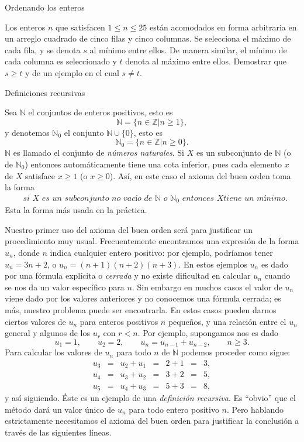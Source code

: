 \begin{section}{Ordenando los enteros}
\begin{enumex}
    \item Los enteros $n$ que satisfacen $1 \le n \le 25$ están acomodados en forma arbitraria en un arreglo cuadrado de cinco filas y cinco columnas. Se selecciona el máximo  de cada fila, y se denota $s$ al mínimo entre ellos. De manera similar, el mínimo de cada columna es seleccionado y $t$ denota al máximo entre ellos. Demostrar que $s\ge t$ y de un ejemplo en el cual $s\not=t$.
\end{enumex}

\end{section}

\begin{section}{Definiciones recursivas}\label{seccion-definiciones-recursivas}

Sea $\mathbb N$ el conjuntos de enteros positivos, esto es
$$
\mathbb N = \{ n \in \mathbb Z | n\ge 1\},
$$
y denotemos $\mathbb N_0$ el conjunto $\mathbb N \cup \{0\}$, esto
es
$$
\mathbb N_0 = \{ n \in \mathbb Z | n\ge 0\}.
$$
$\mathbb{N}$  es llamado el conjunto de  \textit{números naturales}. Si $X$ es un subconjunto de $\mathbb N$ (o de $\mathbb N_0$)  entonces automáticamente tiene una cota inferior, pues cada elemento $x$ de $X$ satisface $x\ge 1$ (o $x\ge 0$). As{í}, en este caso el axioma del buen orden toma la forma
$$
\begin{aligned}
&\textit{si $X$ es un subconjunto no vacío de $\mathbb N$ o $\mathbb N_0$ entonces $X$
 tiene un mínimo.}
\end{aligned}
$$
Esta la forma más usada en la práctica.

Nuestro primer uso del axioma del buen orden será para justificar un procedimiento muy usual. Frecuentemente encontramos una expresión de la forma $u_n$, donde $n$ indica cualquier entero positivo: por ejemplo, podríamos tener $u_n=3n+2$, o $u_n = (n+1)(n+2)(n+3)$. En estos ejemplos $u_n$ es dado por una fórmula explícita o \textit{cerrada} y no existe dificultad en calcular $u_n$ cuando se nos da un valor específico para $n$. Sin embargo en muchos casos el valor de $u_n$ viene dado por los valores anteriores y no conocemos una fórmula cerrada; es más, nuestro problema puede ser encontrarla. En estos casos pueden darnos ciertos valores de $u_n$ para enteros positivos $n$ peque\~nos, y una relación entre el $u_n$ general y algunos de los $u_r$ con $r<n$. Por ejemplo, supongamos nos es dado 
$$ 
u_1=1, \qquad u_2=2, \qquad u_n =u_{n-1} +u_{n-2}, \qquad n\ge 3.
$$
Para calcular los valores de $u_n$ para todo $n$ de $\mathbb N$ podemos proceder como sigue:
$$
\begin{matrix}
u_3 & = & u_2 + u_1 & = & 2+1 &=& 3, \\
u_4 & = & u_3 + u_2 & = & 3+2 &=& 5, \\
u_5 & = & u_4 + u_3 & = & 5+3 &=& 8,
\end{matrix}
$$
y así siguiendo.  Éste es un ejemplo de una \textit{definición recursiva}. Es ``obvio'' que el método dará un valor único de $u_n$ para todo entero positivo $n$. Pero hablando estrictamente necesitamos el axioma del buen orden para justificar la conclusión a través de las siguientes líneas.


\end{section}
